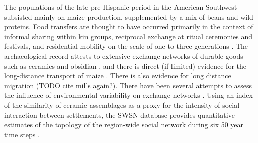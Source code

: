 \documentclass[10pt]{iopart}
\begin{document}
 

The populations of the late pre-Hispanic period in the American Southwest subsisted mainly on maize production, supplemented by a mix of beans and wild proteins. Food transfers are thought to have occurred primarily in the context of informal sharing within kin groups, reciprocal exchange at ritual ceremonies and festivals, and residential mobility on the scale of one to three generations \parencite{Hegmon1991,Hegmon1996,Kohler1996TheAnasazi,Varien1999SedentismBeyond,Cordell2007MesaMigration}. The archaeological record attests to extensive exchange networks of durable goods such as ceramics and obsidian \parencite{Mills2013a}, and there is direct (if limited) evidence for the long-distance transport of maize \parencite{Benson2009PossibleMexico,Benson2010WhoDrought}. There is also evidence for long distance migration (TODO cite mills again?). There have been several attempts to assess the influence of environmental variability on exchange networks \parencite{Rautman1993,Cordell2007,Strawhacker2017RiskProvince}.  Using an index of the similarity of ceramic assemblages as a proxy for the intensity of social interaction between settlements, the SWSN database provides quantitative estimates of the topology of the region-wide social network during six 50 year time steps \parencite{Mills2013a}.

\end{document}
